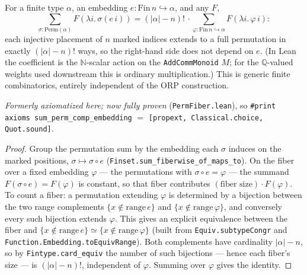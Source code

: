 \begin{theorem}
\label{ax:fiber_count}
\leanok
For a finite type $\alpha$, an embedding $e : \mathrm{Fin}\,n \hookrightarrow \alpha$,
and any $F$,
\[
  \sum_{\sigma : \mathrm{Perm}(\alpha)} F(\lambda i.\,\sigma(e\,i))
  = (|\alpha|-n)!\, \cdot
    \sum_{\varphi : \mathrm{Fin}\,n \hookrightarrow \alpha} F(\lambda i.\,\varphi\,i):
\]
each injective placement of $n$ marked indices extends to a full permutation in
exactly $(|\alpha|-n)!$ ways, so the right-hand side does not depend on $e$. (In
Lean the coefficient is the $\mathbb{N}$-scalar action on the
\texttt{AddCommMonoid} $M$; for the $\mathbb{Q}$-valued weights used downstream
this is ordinary multiplication.) This is generic finite combinatorics, entirely
independent of the ORP construction.

\emph{Formerly axiomatized here; now fully proven} (\texttt{PermFiber.lean}), so
\texttt{\#print axioms sum\_perm\_comp\_embedding} $=$
\texttt{[propext, Classical.choice, Quot.sound]}.
\end{theorem}
\begin{proof}
\leanok
Group the permutation sum by the embedding each $\sigma$ induces on the marked
positions, $\sigma \mapsto \sigma \circ e$
(\texttt{Finset.sum\_fiberwise\_of\_maps\_to}). On the fiber over a fixed
embedding $\varphi$ --- the permutations with $\sigma \circ e = \varphi$ --- the
summand $F(\sigma \circ e) = F(\varphi)$ is constant, so that fiber contributes
$(\text{fiber size}) \cdot F(\varphi)$. To count a fiber: a permutation extending
$\varphi$ is determined by a bijection between the two range complements
$\{x \notin \mathrm{range}\,e\}$ and $\{x \notin \mathrm{range}\,\varphi\}$, and
conversely every such bijection extends $\varphi$. This gives an explicit
equivalence between the fiber and
$\{x \notin \mathrm{range}\,e\} \simeq \{x \notin \mathrm{range}\,\varphi\}$
(built from \texttt{Equiv.subtypeCongr} and
\texttt{Function.Embedding.toEquivRange}). Both complements have cardinality
$|\alpha|-n$, so by \texttt{Fintype.card\_equiv} the number of such bijections ---
hence each fiber's size --- is $(|\alpha|-n)!$, independent of $\varphi$. Summing
over $\varphi$ gives the identity.
\end{proof}

